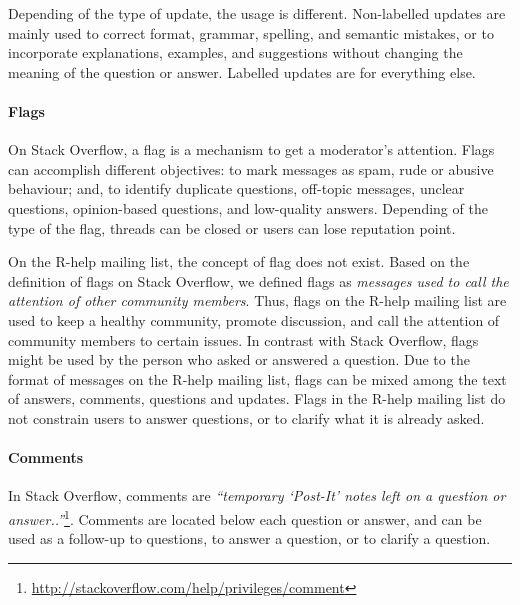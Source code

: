 	Depending of the type of update, the usage is different.
	Non-labelled updates are mainly used to correct format, grammar, spelling, and semantic mistakes, or to incorporate explanations, examples, and suggestions without changing the meaning of the question or answer. Labelled updates are for everything else.


\paragraph*{Flags}

	On Stack Overflow, a flag is a mechanism to get a moderator's attention.
	Flags can accomplish different objectives: to mark messages as spam, rude or abusive behaviour; and, to identify duplicate questions, off-topic messages, unclear questions, opinion-based questions, and low-quality answers.
	Depending of the type of the flag, threads can be closed or users can lose reputation point.


On the R-help mailing list, the concept of flag does not exist. 
Based on the definition of flags on Stack Overflow, we defined flags as \emph{messages used to call the attention of other community members}.
Thus, flags on the R-help mailing list are used to keep a healthy community, promote discussion, and call the attention of community members to certain issues.
In contrast with Stack Overflow, flags might be used by the person who asked or answered a question.
Due to the format of messages on the R-help mailing list, flags can be mixed among the text of answers, comments, questions and updates.
	Flags in the R-help mailing list do not constrain users to answer questions, or to clarify what it is already asked.


\paragraph*{Comments}
In Stack Overflow, comments are \textit{``temporary `Post-It' notes left on a question or answer..''}\footnote{\url{http://stackoverflow.com/help/privileges/comment}}.
	Comments are located below each question or answer, and can be used as a follow-up to questions, to answer a question, or to clarify a question.

